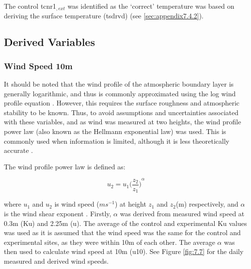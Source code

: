 \documentclass[final,3p,times,authoryear]{elsarticle}
\begin{document}


The control \gls{tcnr1}$_{,ext}$ was identified as the `correct' temperature was based on deriving the surface temperature (\gls{tsdrvd}) (see \ref{sec:appendix7.4.2}).



\subsection{Derived Variables}\label{sec:appendix7.4}
\subsubsection{Wind Speed 10m}\label{sec:appendix7.4.1}

It should be noted that the wind profile of the atmospheric boundary layer is generally logarithmic, and thus is commonly approximated using the log wind profile equation \citep{Banuelos-Ruedas2010}. However, this requires the surface roughness and atmospheric stability to be known. Thus, to avoid assumptions and uncertainties associated with these variables, and as wind was measured at two heights, the wind profile power law (also known as the Hellmann exponential law) was used. This is commonly used when information is limited, although it is less theoretically accurate \citep{Banuelos-Ruedas2010}.

The wind profile power law is defined as:

\begin{equation}
u_{2} = u_{1}  { \bigg( \frac{ z_{2} }{ z_{1} } \bigg) } ^{\alpha}
\label{eq:7.4}
\end{equation}


where $u_{1}$ and $u_{2}$ is wind speed ($ms^{-1}$) at height $z_{1}$ and $z_{2}$(m) respectively, and $\alpha$ is the wind shear exponent \citep{Manwell2010}. Firstly, $\alpha$ was derived from measured wind speed at 0.3m (\gls{Ku}) and 2.25m (\gls{u}). The average of the control and experimental \gls{Ku} values was used as it is assumed that the wind speed was the same for the control and experimental sites, as they were within 10m of each other. The average $\alpha$ was then used to calculate wind speed at 10m (\gls{u10}). See Figure \ref{fig:7.7} for the daily measured and derived wind speeds.
\end{document}
